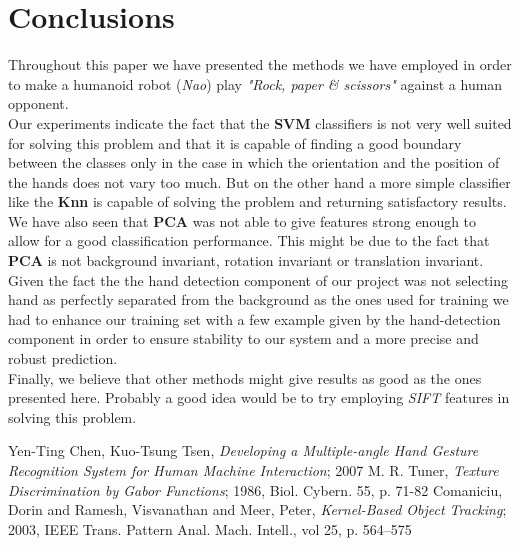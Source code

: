 \documentclass[a4paper, 11pt, twocolumn]{article}
\begin{document}
    \section{Conclusions}
	\label{sec:conclusion}
		Throughout this paper we have presented the methods we have employed in order to make a humanoid robot (\emph{Nao}) play \emph{"Rock, paper \& scissors"} against a human opponent.\\
 		\hspace*{10px}Our experiments indicate the fact that the \textbf{SVM} classifiers is not very well suited for solving this problem and that it is capable of finding a good boundary between the classes only in the case in which the orientation and the position of the hands does not vary too much. But on the other hand a more simple classifier like the \textbf{Knn} is capable of solving the problem and returning satisfactory results.\\
		\hspace*{10px}We have also seen that \textbf{PCA} was not able to give features strong enough to allow for a good classification performance. This might be due to the fact that \textbf{PCA} is not background invariant, rotation invariant or translation invariant.\\
		\hspace*{10px}Given the fact the the hand detection component of our project was not selecting hand as perfectly separated from the background as the ones used for training we had to enhance our training set with a few example given by the hand-detection component in order to ensure stability to our system and a more precise and robust prediction.\\
		\hspace*{10px}Finally, we believe that other methods might give results as good as the ones presented here. Probably a good idea would be to try employing \emph{SIFT} features in solving this problem.
	\begin{thebibliography}{2}
		Yen-Ting Chen, Kuo-Tsung Tsen, \emph{Developing a Multiple-angle Hand Gesture Recognition System for Human Machine Interaction}; 2007
		M. R. Tuner, \emph{Texture Discrimination by Gabor Functions}; 1986, Biol. Cybern. 55, p. 71-82 
		Comaniciu, Dorin and Ramesh, Visvanathan and Meer, Peter, \emph{Kernel-Based Object Tracking}; 2003, IEEE Trans. Pattern Anal. Mach. Intell., vol 25, p. 564--575
	\end{thebibliography}    
\end{document}
